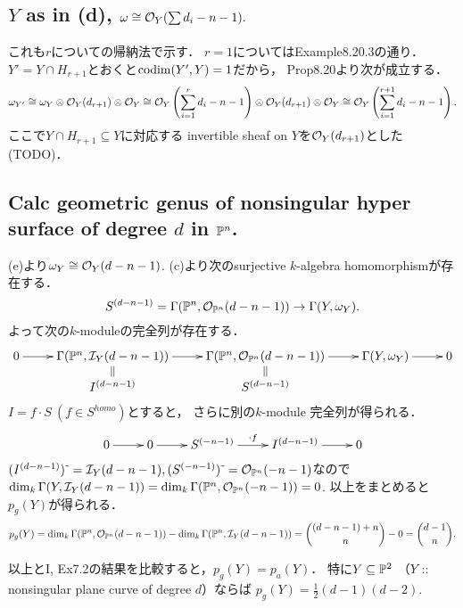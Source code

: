 \documentclass[a4paper]{jsarticle}
\newcommand{\shCano}{\omega}
\begin{document}
    \subsection{$Y$ as in (d), $\shCano \iso \shO_Y(\sum d_i-n-1).$}
    これも$r$についての帰納法で示す．
    $r=1$についてはExample8.20.3の通り．
    $Y'=Y \cap H_{r+1}$とおくと$\operatorname{codim}(Y', Y)=1$だから，
    Prop8.20より次が成立する．
    \[
        \shCano_{Y'}
        \iso \shCano_Y \otimes \shO_Y(d_{r+1}) \otimes \shO_Y
        \iso \shO_Y \left(\sum_{i=1}^r d_i-n-1 \right) \otimes \shO_Y(d_{r+1}) \otimes \shO_Y
        \iso \shO_Y \left(\sum_{i=1}^{r+1} d_i-n-1 \right).
    \]
    ここで$Y \cap H_{r+1} \subseteq Y$に対応する
    invertible sheaf on $Y$を$\mathcal{O}_Y(d_{r+1})$とした(TODO)．

    \subsection{Calc geometric genus of nonsingular hyper surface of degree $d$ in $\mathbb{P}^n$.}
    (e)より$\shCano_Y \iso \shO_Y(d-n-1)$.
    (c)より次のsurjective $k$-algebra homomorphismが存在する．
    \[ S^{(d-n-1)}=\Gamma(\proj^n, \shO_{\proj^n}(d-n-1)) \to \Gamma(Y, \shCano_Y). \]
    よって次の$k$-moduleの完全列が存在する．
    \[
    \xymatrix@R=10pt
    {
        0 \ar[r]
        & \Gamma(\proj^n, \shI_Y(d-n-1)) \ar[r]
        & \Gamma(\proj^n, \shO_{\proj^n}(d-n-1)) \ar[r]
        & \Gamma(Y, \shCano_Y) \ar[r]
        & 0 \\
        {} & \ar@{=}[u]I^{(d-n-1)} & \ar@{=}[u]S^{(d-n-1)} & {} {}
    }
    \]
    $I=f \cdot S \ (f \in S^{homo})$とすると，
    さらに別の$k$-module 完全列が得られる．
    \[
    \xymatrix
    {
        0 \ar[r]& 0 \ar[r]& S^{(-n-1)} \ar[r]^-{\cdot f}& I^{(d-n-1)} \ar[r]& 0
    }
    \]
    $(I^{(d-n-1)})\,\tilde{}\,=\mathcal{I}_Y(d-n-1),(S^{(-n-1)})\,\tilde{}\,=\mathcal{O}_{\mathbb{P}^n}(-n-1)$なので
    $\dim_k \Gamma(Y, \mathcal{I}_Y(d-n-1))=\dim_k \Gamma(\mathbb{P}^n, \mathcal{O}_{\mathbb{P}^n}(-n-1))=0$.
    以上をまとめると$p_g(Y)$が得られる．
    \[
        p_g(Y)
        =\dim_k \Gamma(\mathbb{P}^n, \mathcal{O}_{\mathbb{P}^n}(d-n-1))-\dim_k \Gamma(\mathbb{P}^n, \mathcal{I}_Y(d-n-1))
        =\binom{(d-n-1)+n}{n}-0
        =\binom{d-1}{n}.
    \]

    以上とI, Ex7.2の結果を比較すると，$p_g(Y)=p_a(Y)$．
    特に$Y \subseteq \mathbb{P}^2$
    （$Y$ :: nonsingular plane curve of degree $d$）ならば
    $p_g(Y)=\frac{1}{2}(d-1)(d-2)$.
\end{document}
